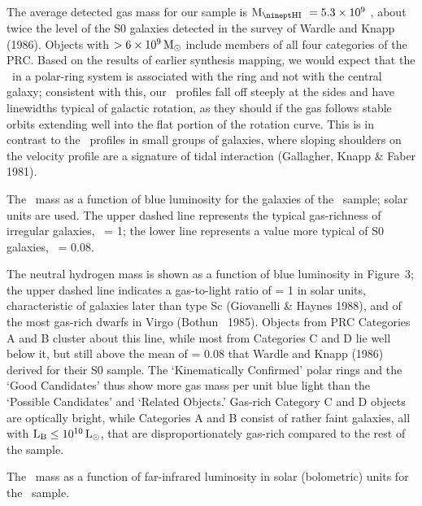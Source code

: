 The average detected gas mass for our sample 
is $\mhi\ = 5.3 \times 10^9$ \MSUN, 
about twice the level of the S0 galaxies detected in the survey of
Wardle and Knapp (1986).
Objects with \MHI $> 6 \times 10^9 {\,{\rm M}_\odot}$ include members of all 
four categories of the PRC.  
Based on the results of earlier synthesis mapping, we would expect that the
\HI\ in a polar-ring system is associated with the ring and not with
the central galaxy; consistent with this, our \HI\ profiles fall off 
steeply at the sides and have linewidths typical of galactic rotation, 
as they should if the gas follows stable orbits extending 
well into the flat portion of the rotation curve.  
This is in contrast to the \HI\ profiles in small groups of galaxies, 
where sloping shoulders on the velocity profile are a signature of tidal  
interaction (Gallagher, Knapp \& Faber 1981). 

\bigskip
\centerline{}

\medskip
{\tenpt 
   
The \HI\ mass as a function of blue luminosity for the 
galaxies of the \ sample; solar units are used.  The upper dashed 
line represents the typical gas-richness of irregular galaxies, \MHILB\ = 1; 
the lower line represents a value more typical of S0 galaxies, \MHILB\ = 0.08.
}
\bigskip

The neutral hydrogen mass is shown as a function of blue 
luminosity in Figure~3; the upper dashed line indicates a gas-to-light ratio 
of \MHILB = 1 in solar units, characteristic of galaxies 
later than type Sc (Giovanelli \& Haynes 1988), and of the most gas-rich
dwarfs in Virgo (Bothun \etal\ 1985).  Objects from PRC Categories A and B 
cluster about this line, while most from Categories C and D 
lie well below it, but still above the mean of 
\MHILB= 0.08 that Wardle and Knapp (1986) derived for their S0 sample.
The `Kinematically Confirmed' polar rings and the `Good Candidates' thus 
show more gas mass per unit blue light than the `Possible Candidates' 
and `Related Objects.'  
Gas-rich Category C and D objects are optically bright, 
while Categories A and B consist of rather faint galaxies, 
all with $\rm L_B \leq 10^{10} {\,{\rm L}_\odot}$, that are disproportionately gas-rich 
compared to the rest of the sample.   

\bigskip
\centerline{}

\medskip
{\tenpt 
   
The \HI\ mass as a function of far-infrared luminosity in 
solar (bolometric) units for the \ sample.
}
\bigskip

